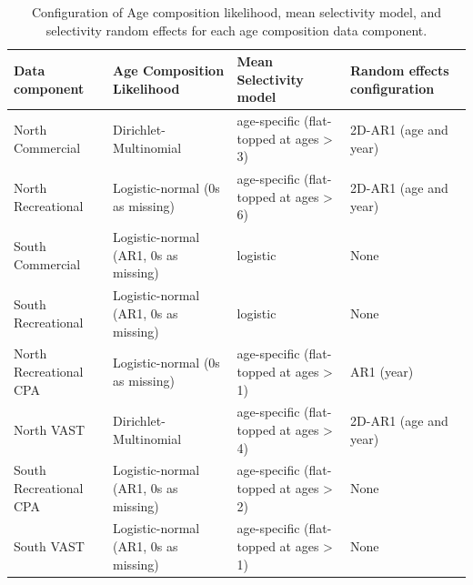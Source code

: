 \documentclass[
]{article}
\begin{document}
\begin{landscape}\begin{table}

\caption{\label{tab:age-comp-sel-table}Configuration of Age composition likelihood, mean selectivity model, and selectivity random effects for each age composition data component.}
\centering
\begin{tabular}[t]{llll}
\toprule
Data component & Age Composition Likelihood & Mean Selectivity model & Random effects configuration\\
\midrule
North Commercial & Dirichlet-Multinomial & age-specific (flat-topped at ages > 3) & 2D-AR1 (age and year)\\
North Recreational & Logistic-normal (0s as missing) & age-specific (flat-topped at ages > 6) & 2D-AR1 (age and year)\\
South Commercial & Logistic-normal (AR1, 0s as missing) & logistic & None\\
South Recreational & Logistic-normal (AR1, 0s as missing) & logistic & None\\
North Recreational CPA & Logistic-normal (0s as missing) & age-specific (flat-topped at ages > 1) & AR1 (year)\\
\addlinespace
North VAST & Dirichlet-Multinomial & age-specific (flat-topped at ages > 4) & 2D-AR1 (age and year)\\
South Recreational CPA & Logistic-normal (AR1, 0s as missing) & age-specific (flat-topped at ages > 2) & None\\
South VAST & Logistic-normal (AR1, 0s as missing) & age-specific (flat-topped at ages > 1) & None\\
\bottomrule
\end{tabular}
\end{table}
\end{landscape}
\end{document}
